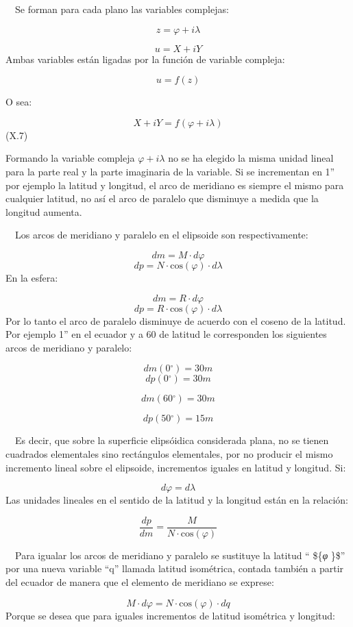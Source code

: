 \documentclass[]{article}
\begin{document}
~~Se forman para cada plano las variables complejas:

\[{z=\varphi +i\lambda }\]

\[{u=X+iY}\] Ambas variables están ligadas por la función de variable
compleja:

\[{u=f\left(z\right)}\]

O sea:

\[{X+iY=f\left(\varphi +i\lambda
\right)}\] (X.7)

Formando la variable compleja \({\varphi +i\lambda }\) no se ha elegido
la misma unidad lineal para la parte real y la parte imaginaria de la
variable. Si se incrementan en 1'' por ejemplo la latitud y longitud, el
arco de meridiano es siempre el mismo para cualquier latitud, no así el
arco de paralelo que disminuye a medida que la longitud aumenta.

~~Los arcos de meridiano y paralelo en el elipsoide son respectivamente:

\[{dm=M\cdot d\varphi }\] \[{dp=N\cdot \text{cos}\left(\varphi
\right)\cdot d\lambda }\] En la esfera:

\[{dm=R\cdot d\varphi }\] \[{dp=R\cdot \text{cos}\left(\varphi
\right)\cdot d\lambda }\] Por lo tanto el arco de paralelo disminuye de
acuerdo con el coseno de la latitud. Por ejemplo 1'' en el ecuador y a
60 de latitud le corresponden los siguientes arcos de meridiano y
paralelo:

\[dm\left(0{}^{\circ}\right)=\text{30}m\]
\[{dp\left(0{}^{\circ}\right)=\text{30}m}\]

\[dm\left(\text{60}{}^{\circ}\right)=\text{30}m\]

\[dp\left(\text{50}{}^{\circ}\right)=\text{15}m\]

~~Es decir, que sobre la superficie elipsóidica considerada plana, no se
tienen cuadrados elementales sino rectángulos elementales, por no
producir el mismo incremento lineal sobre el elipsoide, incrementos
iguales en latitud y longitud. Si:

\[{d\varphi =d\lambda }\] Las unidades lineales en el sentido de la
latitud y la longitud están en la relación:

\[{\frac{dp}{dm}=\frac{M}{N\cdot \text{cos}\left(\varphi \right)}}\]

~~Para igualar los arcos de meridiano y paralelo se sustituye la latitud
`` \$\{\emph{φ} \}\$'' por una nueva variable ``q'' llamada latitud
isométrica, contada también a partir del ecuador de manera que el
elemento de meridiano se exprese:

\[{M\cdot d\varphi =N\cdot \text{cos}\left(\varphi \right)\cdot
dq}\] Porque se desea que para iguales incrementos de latitud isométrica
y longitud:
\end{document}
